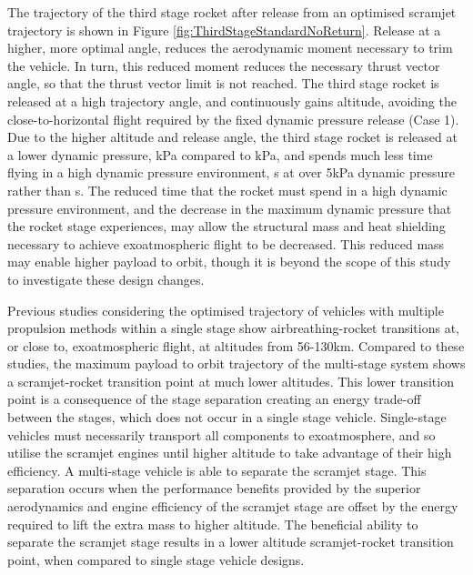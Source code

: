 The trajectory of the third stage rocket after release from an optimised scramjet trajectory is shown in Figure \ref{fig:ThirdStageStandardNoReturn}. Release at a higher, more optimal angle, reduces the aerodynamic moment necessary to trim the vehicle. In turn, this reduced moment reduces the necessary thrust vector angle, so that the thrust vector limit is not reached. The third stage rocket is released at a high trajectory angle, and continuously gains altitude, avoiding the close-to-horizontal flight required by the fixed dynamic pressure release (Case 1).
Due to the higher altitude and release angle, the third stage rocket is released at a lower dynamic pressure, \secondthirdSeparationqCdStandardNoReturn kPa compared to \secondthirdSeparationqConstqNoReturn kPa, and spends much less time flying in a high dynamic pressure environment, \thirdqOverFiveStandard s at over 5kPa dynamic pressure rather than \thirdqOverFiveConstqNoReturn s. 
The reduced time that the rocket must spend in a high dynamic pressure environment, and the decrease in the maximum dynamic pressure that the rocket stage experiences, may allow the structural mass and heat shielding necessary to achieve exoatmospheric flight to be decreased. This reduced mass may enable higher payload to orbit, though it is beyond the scope of this study to investigate these design changes. 


Previous studies considering the optimised trajectory of vehicles with multiple propulsion methods within a single stage show airbreathing-rocket transitions at, or close to, exoatmospheric flight, at altitudes from 56-130km\cite{Lu1993,Trefny1999,Bradford2000}. Compared to these studies, the maximum payload to orbit trajectory of the multi-stage system shows a scramjet-rocket transition point at much lower altitudes.
This lower transition point is a consequence of the stage separation creating an energy trade-off between the stages, which does not occur in a single stage vehicle. Single-stage vehicles must necessarily transport all components to exoatmosphere, and so utilise the scramjet engines until higher altitude to take advantage of their high efficiency. A multi-stage vehicle is able to separate the scramjet stage. 
This separation occurs when the performance benefits provided by the superior aerodynamics and engine efficiency of the scramjet stage are offset by the energy required to lift the extra mass to higher altitude. The beneficial ability
to separate the scramjet stage results in a lower altitude scramjet-rocket transition point, when compared to single
stage vehicle designs.

